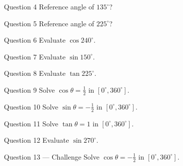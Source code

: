\documentclass[11pt]{article}
\begin{document}
\begin{qbox}{Question 4}
Reference angle of $135^\circ$?\workspace{2.4cm}
\end{qbox}

\begin{qbox}{Question 5}
Reference angle of $225^\circ$?\workspace{2.4cm}
\end{qbox}

\begin{qbox}{Question 6}
Evaluate $\cos240^\circ$.\workspace{2.4cm}
\end{qbox}

\begin{qbox}{Question 7}
Evaluate $\sin150^\circ$.\workspace{2.4cm}
\end{qbox}

\begin{qbox}{Question 8}
Evaluate $\tan225^\circ$.\workspace{2.4cm}
\end{qbox}

\begin{qbox}{Question 9}
Solve $\cos\theta=\tfrac12$ in $[0^\circ,360^\circ]$.\workspace{2.4cm}
\end{qbox}

\begin{qbox}{Question 10}
Solve $\sin\theta=-\tfrac12$ in $[0^\circ,360^\circ]$.\workspace{2.4cm}
\end{qbox}

\begin{qbox}{Question 11}
Solve $\tan\theta=1$ in $[0^\circ,360^\circ]$.\workspace{2.4cm}
\end{qbox}

\begin{qbox}{Question 12}
Evaluate $\sin270^\circ$.\workspace{2.4cm}
\end{qbox}

\begin{qbox}{Question 13 --- Challenge}
Solve $\cos\theta=-\tfrac12$ in $[0^\circ,360^\circ]$.\workspace{3cm}
\end{qbox}

\clearpage
{}
\end{document}

